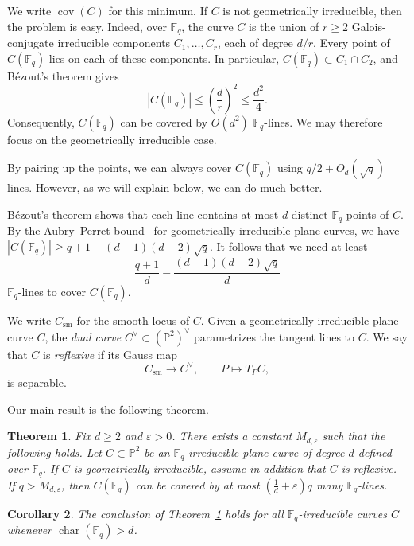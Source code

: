\documentclass[10pt,a4paper]{amsart}
\newtheorem{theorem}{Theorem}[section]
\newtheorem{corollary}[theorem]{Corollary}
\theoremstyle{definition}
\theoremstyle{remark}
\newcommand{\Fq}{\mathbb{F}_q}
\newcommand{\bP}{\mathbb{P}}
\begin{document}
We write $\operatorname{cov}(C)$ for this minimum. If $C$ is not geometrically irreducible, then the problem is easy. Indeed, over $\overline{\Fq}$, the curve $C$ is the union of $r\geq 2$ Galois-conjugate irreducible components $C_1,\ldots,C_r$, each of degree $d/r$. Every point of $C(\Fq)$ lies on each of these components. In particular, $C(\Fq)\subset C_1\cap C_2$, and B\'ezout's theorem gives
\[
|C(\Fq)|\leq \left(\frac{d}{r}\right)^2\leq \frac{d^2}{4}.
\]
Consequently, $C(\Fq)$ can be covered by $O(d^2)$ $\Fq$-lines. We may therefore focus on the geometrically irreducible case.

By pairing up the points, we can always cover $C(\Fq)$ using $q/2+O_d(\sqrt{q})$ lines. However, as we will explain below, we can do much better.

B\'ezout's theorem shows that each line contains at most $d$ distinct $\Fq$-points of $C$. By the Aubry--Perret bound~\cite{AP96} for geometrically irreducible plane curves, we have $|C(\Fq)|\geq q+1-(d-1)(d-2)\sqrt q$. It follows that we need at least
\begin{equation}\label{eq:lower-bound}
\frac{q+1}{d} - \frac{(d-1)(d-2)\sqrt{q}}{d}
\end{equation}
$\Fq$-lines to cover $C(\Fq)$.

We write $C_{\mathrm{sm}}$ for the smooth locus of $C$. Given a geometrically irreducible plane curve $C$, the \emph{dual curve} $C^\vee\subset(\bP^2)^\vee$ parametrizes the tangent lines to $C$. We say that $C$ is \emph{reflexive} if its Gauss map
\[
C_{\mathrm{sm}}\longrightarrow C^\vee,
\qquad
P\longmapsto T_PC,
\]
is separable. 

Our main result is the following theorem.

\begin{theorem}\label{thm:main}
Fix $d\geq 2$ and $\varepsilon>0$. There exists a constant $M_{d,\varepsilon}$ such that the following holds. Let $C\subset\bP^2$ be an $\Fq$-irreducible plane curve of degree $d$ defined over $\Fq$. If $C$ is geometrically irreducible, assume in addition that $C$ is reflexive. If $q>M_{d,\varepsilon}$, then $C(\Fq)$ can be covered by at most $\left(\frac{1}{d}+\varepsilon\right)q$ many $\Fq$-lines.
\end{theorem}

\begin{corollary}\label{cor:large-characteristic}
The conclusion of Theorem~\ref{thm:main} holds for all $\Fq$-irreducible curves $C$ whenever $\operatorname{char}(\Fq)>d$.
\end{corollary}
\end{document}
